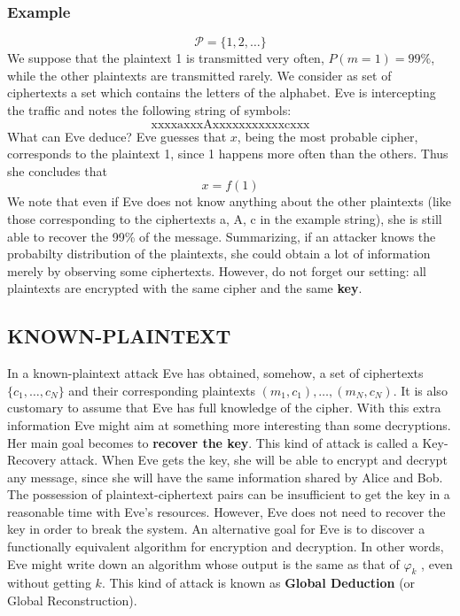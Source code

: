 \documentclass[a4paper, 10pt, titlepage]{article}
\begin{document}
\subsubsection*{Example}
$$\mathcal{P}= \{1,2, \dots \}$$
We suppose that the plaintext 1 is transmitted very often,
$P(m = 1) = 99\%$, while the other plaintexts are transmitted rarely.
We consider as set of ciphertexts a set which contains the letters of the alphabet. Eve is intercepting the traffic and notes the following string of symbols:
$$\text{xxxxaxxxAxxxxxxxxxxxcxxx}$$
What can Eve deduce? Eve guesses that $x$, being the most probable
cipher, corresponds to the plaintext 1, since 1 happens more often than the others. Thus she concludes that
$$x= f(1)$$
We note that even if Eve does not know anything about the other plaintexts (like those corresponding to the ciphertexts a, A, c in the example string), she is still able to recover the 99\% of the message. Summarizing, if an attacker knows the probabilty distribution of the plaintexts, she could obtain a lot of information merely by observing some ciphertexts.
However, do not forget our setting: all plaintexts are encrypted with the same cipher and the same \textbf{key}.

\subsection{KNOWN-PLAINTEXT}
In a known-plaintext attack Eve has obtained, somehow, a set of
ciphertexts $\{c_1, \dots , c_N \}$ and their corresponding plaintexts $(m_1, c_1), \dots, (m_N, c_N)$.
It is also customary to assume that Eve has full knowledge of the cipher. With this extra information Eve might aim at something more interesting than some decryptions. Her main goal becomes to \textbf{recover the key}. This kind of attack is called a Key-Recovery attack. When Eve gets the key, she will be able to encrypt and decrypt any message, since she will have the same information shared by Alice and Bob.
The possession of plaintext-ciphertext pairs can be insufficient to get the key in a reasonable time with Eve’s resources. However, Eve does not need to recover the key in order to break the system. An alternative goal for Eve is to discover a functionally equivalent algorithm for encryption and decryption. In other words, Eve might write down an algorithm whose output is the same as that of $\varphi_k$ , even without getting $k$. This kind of attack is known as \textbf{Global Deduction} (or Global Reconstruction).
\end{document}
